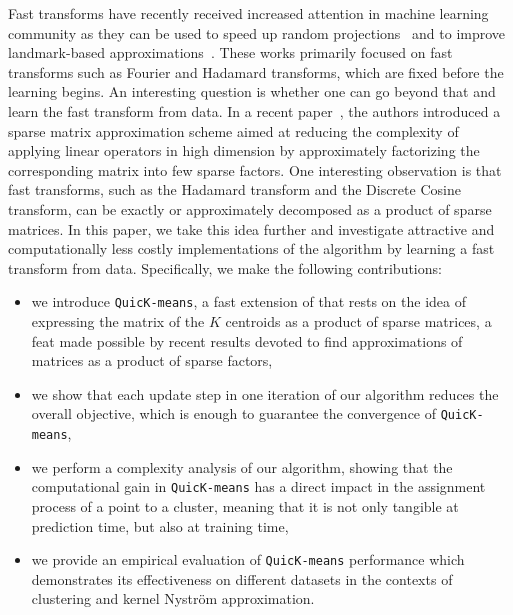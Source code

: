 Fast transforms have recently received increased attention in machine learning community as they can be used  to speed up random projections~\cite{le2013fastfood,gittens2016revisiting} and to improve landmark-based approximations~\cite{si2016computationally}.
%
These works primarily focused on fast transforms such as Fourier and Hadamard transforms, which are fixed before the learning begins. An interesting question is whether one can go beyond that and learn the fast transform from data. 
%
In a recent paper~\cite{LeMagoarou2016Flexible}, the authors introduced a sparse matrix approximation scheme aimed  at  reducing the  complexity  of  applying  linear  operators  in  high  dimension by   approximately   factorizing   the   corresponding   matrix   into few   sparse   factors. One interesting observation is that fast transforms, such as the  Hadamard  transform  and  the  Discrete  Cosine  transform, can be exactly or approximately decomposed as a product of sparse matrices.
%
In this paper, we take this idea further and investigate attractive and computationally less costly implementations of the \kmeans algorithm by learning a fast transform from data.
%
Specifically, we make the following contributions:
\begin{itemize}
	\item we introduce \texttt{QuicK-means}, a fast extension of \kmeans that rests on the idea of expressing the matrix of the $K$ centroids as a product of sparse matrices, a feat made possible by recent results devoted to find approximations of matrices as a product of sparse factors,
	\item we show that each update step in one iteration of our algorithm  reduces the overall objective, which is enough to guarantee the convergence of \texttt{QuicK-means},
	\item we perform a complexity analysis of our algorithm, showing that the computational gain in \texttt{QuicK-means}  has a direct impact in the assignment process of a point to a cluster, meaning that it is not only tangible at prediction time, but also at training time,
	\item we provide an empirical evaluation of \texttt{QuicK-means}  performance which demonstrates its effectiveness on different datasets in the contexts of clustering and kernel Nystr\"om approximation.
\end{itemize}



